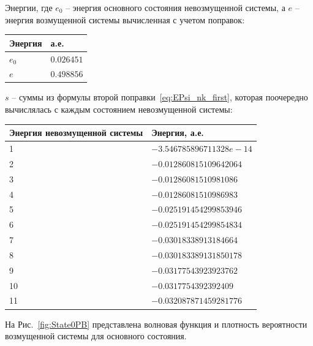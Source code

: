 Энергии, где $e_0$ -- энергия основного состояния невозмущенной системы, а $e$ -- энергия возмущенной системы вычисленная с учетом поправок:

\begin{table}[H]
    \centering
    \begin{tabularx}{0.6\linewidth}{|X|X|}
        \hline
        \textbf{Энергия}&\textbf{а.е.} \\
        \hline
        $e_0$ & $0.026451$ \\
        \hline
        $e$ & $0.498856$ \\
        \hline
    \end{tabularx}
    \label{tab:sums0}
\end{table}

$s$ -- суммы из формулы второй поправки~\eqref{eq:EPsi_nk_first}, которая поочередно вычислялась с каждым состоянием невозмущенной системы:

\begin{table}[H]
    \centering
    \begin{tabularx}{0.8\linewidth}{|X|X|}
        \hline
        \textbf{Энергия невозмущенной системы}&\textbf{Энергия, а.е.} \\
        \hline
        1 & $-3.546785896711328e-14$ \\
        \hline
        2 & $-0.012860815109642064$ \\
        \hline
        3 & $-0.01286081510981086$ \\
        \hline
        4 & $-0.01286081510986983$ \\
        \hline
        5 & $-0.025191454299853946$ \\
        \hline
        6 & $-0.025191454299854834$ \\
        \hline
        7 & $-0.03018338913184664$ \\
        \hline
        8 & $-0.030183389131850178$ \\
        \hline
        9 & $-0.03177543923923762$ \\
        \hline
        10 & $-0.0317754392392409$ \\
        \hline
        11 & $-0.032087871459281776$ \\
        \hline
    \end{tabularx}
    \label{tab:energies_012}
\end{table}

На Рис.~\ref{fig:State0PB} представлена волновая функция и плотность вероятности возмущенной системы для основного состояния.

